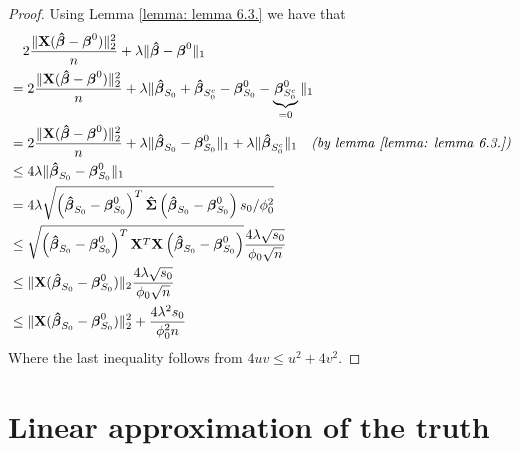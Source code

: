 \begin{proof}
    Using Lemma \ref{lemma: lemma 6.3.} we have that
    \begin{align*}
         & \quad 2 \frac{\|\mathbf{X}(\boldsymbol{\hat{\beta}}-\boldsymbol{\beta}^{0})\|_{2}^{2}}{n} + \lambda\|\boldsymbol{\hat{\beta}}-\boldsymbol{\beta}^{0}\|_{1}                                                                                                      \\
         & = 2 \frac{\|\mathbf{X}(\boldsymbol{\hat{\beta}}-\boldsymbol{\beta}^{0})\|_{2}^{2}}{n} + \lambda \| \boldsymbol{\hat{\beta}}_{S_0} + \boldsymbol{\hat{\beta}}_{S_{0}^{c}} - \boldsymbol{\beta}^{0}_{S_0} - \underbrace{\boldsymbol{\beta}^{0}_{S_0^c}}_{=0} \|_{1}                              \\
         & = 2 \frac{\|\mathbf{X}(\boldsymbol{\hat{\beta}}-\boldsymbol{\beta}^{0})\|_{2}^{2}}{n} + \lambda \| \boldsymbol{\hat{\beta}}_{S_0} - \boldsymbol{\beta}^{0}_{S_0} \|_{1} + \lambda \| \boldsymbol{\hat{\beta}}_{S_{0}^{c}} \|_1 \quad \textit{(by lemma \ref{lemma: lemma 6.3.})} \\
         & \leq 4 \lambda \|\boldsymbol{\hat{\beta}}_{S_{0}} - \boldsymbol{\beta}_{S_{0}}^{0} \|_{1}                                                                                                                                        \\
         & = 4 \lambda \sqrt{\left( \boldsymbol{\hat{\beta}}_{S_{0}} - \boldsymbol{\beta}_{S_{0}}^{0} \right)^{T} \boldsymbol{\hat{\Sigma}} \left( \boldsymbol{\hat{\beta}}_{S_{0}} - \boldsymbol{\beta}_{S_{0}}^{0}  \right) s_{0} / \phi_{0}^{2}}                                          \\
         & \leq \sqrt{\left( \boldsymbol{\hat{\beta}}_{S_{0}} - \boldsymbol{\beta}_{S_{0}}^{0} \right)^{T} \mathbf{X}^T \mathbf{X} \left( \boldsymbol{\hat{\beta}}_{S_{0}} - \boldsymbol{\beta}_{S_{0}}^{0}  \right)} \frac{4 \lambda \sqrt{s_{0}}}{\phi_{0} \sqrt{n}}                     \\
         & \leq \| \mathbf{X} ( \boldsymbol{\hat{\beta}}_{S_{0}} - \boldsymbol{\beta}_{S_{0}}^{0} ) \|_2 \frac{4 \lambda \sqrt{s_{0}}}{\phi_{0} \sqrt{n}}                                                                                           \\
         & \leq \| \mathbf{X} ( \boldsymbol{\hat{\beta}}_{S_{0}} - \boldsymbol{\beta}_{S_{0}}^{0} ) \|^2_2 + \frac{4 \lambda^2 s_{0}}{\phi^2_{0} n}                                                                                                 \\
    \end{align*}
    Where the last inequality follows from $4uv \leq u^2 + 4v^2$.
\end{proof}

\section{Linear approximation of the truth}

